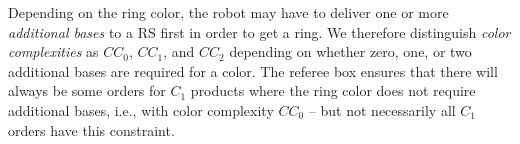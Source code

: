 \documentclass[12pt,twoside]{article}
\begin{document}
Depending on the ring color, the robot may have to deliver one or more
\emph{additional bases} to a RS first in order to get a ring. We
therefore distinguish \emph{color complexities} as $CC_0$, $CC_1$, and
$CC_2$ depending on whether zero, one, or two additional bases are
required for a color. The referee box ensures that there will always
be some orders for $C_1$ products where the ring color does not
require additional bases, i.e., with color complexity $CC_0$ -- but
not necessarily all $C_1$ orders have this constraint.

\begin{figure}
\end{figure}
\end{document}
